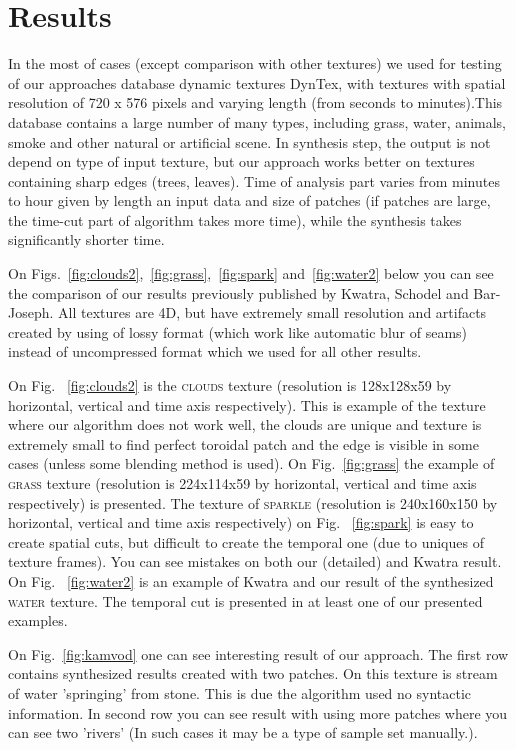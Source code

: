 		
		\section{Results}

In the most of cases (except comparison with other textures) we used for testing of our approaches database dynamic textures DynTex\cite{dyntex}, with textures with spatial resolution of 720 x 576 pixels and varying length (from seconds to minutes).This database contains a large number of many types, including grass, water, animals, smoke and other natural or artificial scene. In synthesis step, the output is not depend on type of input texture, but our approach works better on textures containing sharp edges (trees, leaves). Time of analysis part varies from minutes to hour given by length an input data and size of patches (if patches are large, the time-cut part of algorithm takes more time), while the synthesis takes significantly shorter time.

On Figs.~\ref{fig:clouds2},~\ref{fig:grass},~\ref{fig:spark} and~\ref{fig:water2} below you can see the comparison of our results previously published by Kwatra, Schodel and Bar-Joseph. All textures are 4D, but have extremely small resolution and artifacts created by using of lossy format (which work like automatic blur of seams) instead of uncompressed format which we used for all other results. 

On Fig. ~\ref{fig:clouds2} is the \textsc{clouds} texture (resolution is 128x128x59 by horizontal, vertical and time axis respectively). This is example of the texture where our algorithm does not work well, the clouds are unique and texture is extremely small to find perfect toroidal patch and the edge is visible in some cases (unless some blending method is used). On Fig.~\ref{fig:grass} the example of \textsc{grass} texture (resolution is 224x114x59 by horizontal, vertical and time axis respectively) is presented. The texture of \textsc{sparkle} (resolution is 240x160x150 by horizontal, vertical and time axis respectively) on Fig. ~\ref{fig:spark} is easy to create spatial cuts, but difficult to create the temporal one (due to uniques of texture frames). You can see mistakes on both our (detailed) and Kwatra result. On Fig. ~\ref{fig:water2} is an example of Kwatra and our result of the synthesized \textsc{water} texture. The temporal cut is presented in at least one of our presented examples.

On Fig.~\ref{fig:kamvod} one can see interesting result of our approach. The first row contains synthesized results created with two patches. On this texture is stream of water 'springing' from stone. This is due the algorithm used no syntactic information. In second row you can see result with using more patches where you can see two 'rivers' (In such cases it may be a type of sample set manually.).


